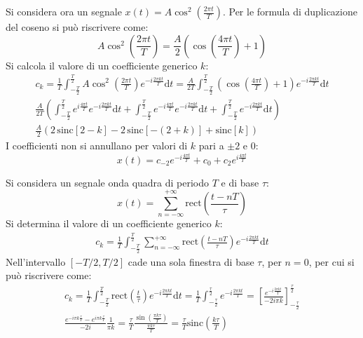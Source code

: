 \documentclass{article}
\newcommand{\rect}{\mathrm{rect}}
\newcommand{\sinc}{\mathrm{sinc}}
\newcommand{\df}{\mathrm{d}}
\numberwithin{equation}{subsection}
\begin{document}
Si considera ora un segnale $x(t)=A\cos^2\left(\frac{2\pi t}{T}\right)$. Per le formula di duplicazione del coseno si può riscrivere come:
\begin{equation*}
    A\cos^2\left(\frac{2\pi t}{T}\right)=\frac{A}{2}\left(\cos\left(\frac{4\pi t}{T}\right)+1\right)
\end{equation*}
Si calcola il valore di un coefficiente generico $k$:
\begin{gather*}
    c_k=\displaystyle\frac{1}{T}\int_{-\frac{T}{2}}^{\frac{T}{2}}A\cos^2\left(\frac{2\pi t}{T}\right)e^{-i\frac{2\pi kt}{T}}\df t=
    \frac{A}{2T}\int_{-\frac{T}{2}}^{\frac{T}{2}}\left(\cos\left(\frac{4\pi t}{T}\right)+1\right)e^{-i\frac{2\pi kt}{T}}\df t\\
    \displaystyle\frac{A}{2T}\left(\int_{-\frac{T}{2}}^{\frac{T}{2}}e^{i\frac{4\pi t}{T}}e^{-i\frac{2\pi kt}{T}}\df t+\int_{-\frac{T}{2}}^{\frac{T}{2}}e^{-i\frac{4\pi t}{T}}e^{-i\frac{2\pi kt}{T}}\df t+\int_{-\frac{T}{2}}^{\frac{T}{2}}e^{-i\frac{2\pi kt}{T}}\df t\right)\\
    \displaystyle\frac{A}{2}\left(2\,\sinc[2-k]-2\,\sinc[-(2+k)]+\sinc[k]\right)
\end{gather*}
I coefficienti non si annullano per valori di $k$ pari a $\pm2$ e $0$:
\begin{equation*}
    x(t)=c_{-2}e^{-i\frac{4\pi t}{T}}+c_0+c_2e^{i\frac{4\pi t}{T}}
\end{equation*}


Si considera un segnale onda quadra di periodo $T$ e di base $\tau$: 
\begin{equation*}
    x(t)=\displaystyle\sum_{n=-\infty}^{+\infty}\rect\left(\frac{t-nT}{\tau}\right)
\end{equation*}
Si determina il valore di un coefficiente generico $k$:
\begin{gather*}
    c_k=\displaystyle\frac{1}{T}\int_{-\frac{T}{2}}^{\frac{T}{2}}\sum_{n=-\infty}^{+\infty}\rect\left(\frac{t-nT}{\tau}\right)e^{-i\frac{2\pi k t}{T}}\df t
\end{gather*}
Nell'intervallo $[-T/2,T/2]$ cade una sola finestra di base $\tau$, per $n=0$, per cui si può riscrivere come:
\begin{gather*}
    c_k=\displaystyle\frac{1}{T}\int_{-\frac{T}{2}}^{\frac{T}{2}}\rect\left(\frac{t}{\tau}\right)e^{-i\frac{2\pi k t}{T}}\df t=\frac{1}{T}\int_{-\frac{\tau}{2}}^{\frac{\tau}{2}}e^{-i\frac{2\pi k t}{T}}=
    \left[\frac{e^{-i\frac{2\pi kt}{T}}}{-2i\pi k}\right]_{-\frac{\tau}{2}}^{\frac{\tau}{2}}\\
    \displaystyle\frac{e^{-i\pi k\frac{\tau}{T}}-e^{i\pi k\frac{\tau}{T}}}{-2i}\frac{1}{\pi k}=\frac{\tau}{T}\frac{\sin\left(\frac{\pi k \tau}{T}\right)}{\frac{\pi k \tau}{T}}=\frac{\tau}{T}\sinc\left(\frac{k \tau}{T}\right)
\end{gather*}
\end{document}
